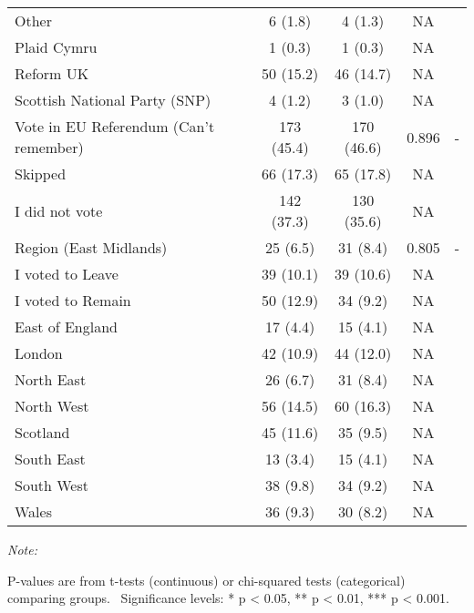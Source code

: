 \begin{table}
\begin{threeparttable}
\begin{tabular}[t]{lcccc}
Other & 6 (1.8) & 4 (1.3) & NA & \\
Plaid Cymru & 1 (0.3) & 1 (0.3) & NA & \\
\addlinespace
Reform UK & 50 (15.2) & 46 (14.7) & NA & \\
Scottish National Party (SNP) & 4 (1.2) & 3 (1.0) & NA & \\
Vote in EU Referendum (Can’t remember) & 173 (45.4) & 170 (46.6) & 0.896 & -\\
Skipped & 66 (17.3) & 65 (17.8) & NA & \\
I did not vote & 142 (37.3) & 130 (35.6) & NA & \\
\addlinespace
Region (East Midlands) & 25 (6.5) & 31 (8.4) & 0.805 & -\\
I voted to Leave & 39 (10.1) & 39 (10.6) & NA & \\
I voted to Remain & 50 (12.9) & 34 (9.2) & NA & \\
East of England & 17 (4.4) & 15 (4.1) & NA & \\
London & 42 (10.9) & 44 (12.0) & NA & \\
\addlinespace
North East & 26 (6.7) & 31 (8.4) & NA & \\
North West & 56 (14.5) & 60 (16.3) & NA & \\
Scotland & 45 (11.6) & 35 (9.5) & NA & \\
South East & 13 (3.4) & 15 (4.1) & NA & \\
South West & 38 (9.8) & 34 (9.2) & NA & \\
\addlinespace
Wales & 36 (9.3) & 30 (8.2) & NA & \\
\bottomrule
\end{tabular}
\begin{tablenotes}
\item \textit{Note: } 
\item P-values are from t-tests (continuous) or chi-squared tests (categorical) comparing groups. \ Significance levels: * p < 0.05, ** p < 0.01, *** p < 0.001.
\end{tablenotes}
\end{threeparttable}
\end{table}

